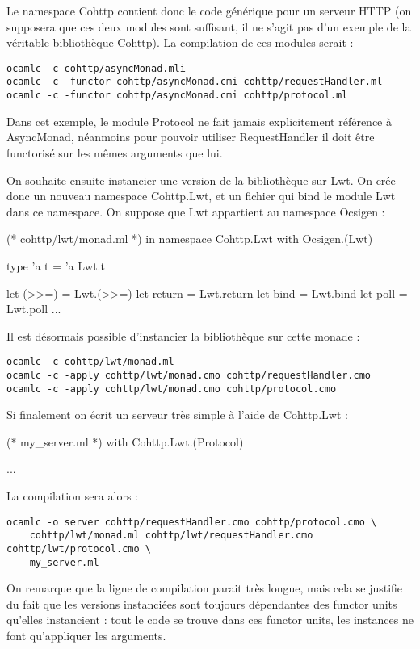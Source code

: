 \documentclass[11pt,a4paper]{report}
\begin{document}
Le namespace Cohttp contient donc le code générique pour un serveur HTTP (on
supposera que ces deux modules sont suffisant, il ne s'agit pas d'un exemple de
la véritable bibliothèque Cohttp). La compilation de ces modules serait :
\begin{verbatim}
ocamlc -c cohttp/asyncMonad.mli
ocamlc -c -functor cohttp/asyncMonad.cmi cohttp/requestHandler.ml
ocamlc -c -functor cohttp/asyncMonad.cmi cohttp/protocol.ml
\end{verbatim}

Dans cet exemple, le module Protocol ne fait jamais explicitement référence à
AsyncMonad, néanmoins pour pouvoir utiliser RequestHandler il doit être
functorisé sur les mêmes arguments que lui.

On souhaite ensuite instancier une version de la bibliothèque sur Lwt. On crée
donc un nouveau namespace Cohttp.Lwt, et un fichier qui bind le module Lwt dans
ce namespace. On suppose que Lwt appartient au namespace Ocsigen :
\begin{OCaml}
(* cohttp/lwt/monad.ml *)
in namespace Cohttp.Lwt
with Ocsigen.(Lwt)

type 'a t = 'a Lwt.t

let (>>=) = Lwt.(>>=)
let return = Lwt.return
let bind = Lwt.bind
let poll = Lwt.poll
...
\end{OCaml} 

Il est désormais possible d'instancier la bibliothèque sur cette monade :

\begin{verbatim}
ocamlc -c cohttp/lwt/monad.ml
ocamlc -c -apply cohttp/lwt/monad.cmo cohttp/requestHandler.cmo
ocamlc -c -apply cohttp/lwt/monad.cmo cohttp/protocol.cmo
\end{verbatim}

Si finalement on écrit un serveur très simple à l'aide de Cohttp.Lwt :
\begin{OCaml}
(* my_server.ml *)
with Cohttp.Lwt.(Protocol)

...
\end{OCaml}

La compilation sera alors :

\begin{verbatim}
ocamlc -o server cohttp/requestHandler.cmo cohttp/protocol.cmo \
    cohttp/lwt/monad.ml cohttp/lwt/requestHandler.cmo cohttp/lwt/protocol.cmo \
    my_server.ml 
\end{verbatim}

On remarque que la ligne de compilation parait très longue, mais cela se
justifie du fait que les versions instanciées sont toujours dépendantes des
functor units qu'elles instancient : tout le code se trouve dans ces functor
units, les instances ne font qu'appliquer les arguments.
\end{document}
